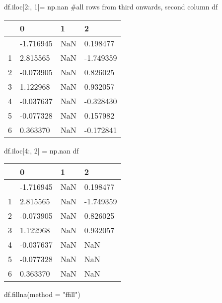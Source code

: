 \documentclass[
  letterpaper,
  DIV=11,
  numbers=noendperiod]{scrreprt}
\newenvironment{Shaded}{\begin{snugshade}}{\end{snugshade}}
\newcommand{\CommentTok}[1]{\textcolor[rgb]{0.37,0.37,0.37}{#1}}
\newcommand{\DecValTok}[1]{\textcolor[rgb]{0.68,0.00,0.00}{#1}}
\newcommand{\NormalTok}[1]{\textcolor[rgb]{0.00,0.23,0.31}{#1}}
\newcommand{\OperatorTok}[1]{\textcolor[rgb]{0.37,0.37,0.37}{#1}}
\newcommand{\StringTok}[1]{\textcolor[rgb]{0.13,0.47,0.30}{#1}}
\begin{document}
\begin{Shaded}
\begin{Highlighting}[]
\NormalTok{df.iloc[}\DecValTok{2}\NormalTok{:, }\DecValTok{1}\NormalTok{]}\OperatorTok{=}\NormalTok{ np.nan   }\CommentTok{\#all rows from third onwards, second column}
\NormalTok{df}
\end{Highlighting}
\end{Shaded}

\begin{longtable}[]{@{}llll@{}}
\toprule\noalign{}
& 0 & 1 & 2 \\
\midrule\noalign{}
\endhead
\bottomrule\noalign{}
\endlastfoot
0 & -1.716945 & NaN & 0.198477 \\
1 & 2.815565 & NaN & -1.749359 \\
2 & -0.073905 & NaN & 0.826025 \\
3 & 1.122968 & NaN & 0.932057 \\
4 & -0.037637 & NaN & -0.328430 \\
5 & -0.077328 & NaN & 0.157982 \\
6 & 0.363370 & NaN & -0.172841 \\
\end{longtable}

\begin{Shaded}
\begin{Highlighting}[]
\NormalTok{df.iloc[}\DecValTok{4}\NormalTok{:, }\DecValTok{2}\NormalTok{] }\OperatorTok{=}\NormalTok{ np.nan}
\NormalTok{df}
\end{Highlighting}
\end{Shaded}

\begin{longtable}[]{@{}llll@{}}
\toprule\noalign{}
& 0 & 1 & 2 \\
\midrule\noalign{}
\endhead
\bottomrule\noalign{}
\endlastfoot
0 & -1.716945 & NaN & 0.198477 \\
1 & 2.815565 & NaN & -1.749359 \\
2 & -0.073905 & NaN & 0.826025 \\
3 & 1.122968 & NaN & 0.932057 \\
4 & -0.037637 & NaN & NaN \\
5 & -0.077328 & NaN & NaN \\
6 & 0.363370 & NaN & NaN \\
\end{longtable}

\begin{Shaded}
\begin{Highlighting}[]
\NormalTok{df.fillna(method }\OperatorTok{=} \StringTok{"ffill"}\NormalTok{)}
\end{Highlighting}
\end{Shaded}
\end{document}
